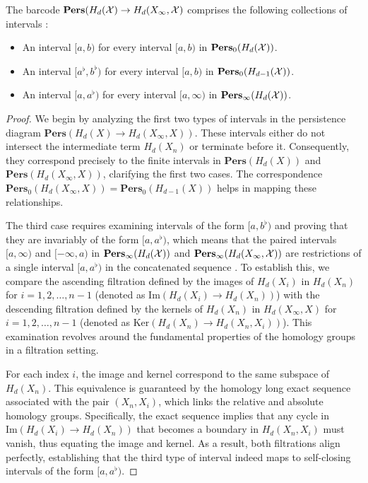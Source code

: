 \begin{corollary}
	The barcode $\textbf{Pers}(H_{d}({\mathcal{X}}) \rightarrow H_{d}(X_{\infty}, {\mathcal{X}})$ comprises
	the following collections of intervals \cite[\S 2.5]{de2011dualities}:
	\begin{itemize}
		\item An interval $[a,b)$ for every interval $[a,b)$ in $\textbf{Pers}_{0}(H_{d}
			({\mathcal{X}}))$.

		\item An interval $[a^{\flat}, b^{\flat})$ for every interval $[a,b)$ in $\textbf
			{Pers}_{0}(H_{d-1}({\mathcal{X}}))$.

		\item An interval $[a,a^{\flat})$ for every interval $[a,\infty)$ in $\textbf
			{Pers}_{\infty}(H_{d}({\mathcal{X}}))$.
	\end{itemize}
\end{corollary}

\begin{proof}
	We begin by analyzing the first two types of intervals in the persistence diagram
	$\textbf{Pers}(H_{d}(X) \to H_{d}(X_{\infty}, X))$. These intervals either do
	not intersect the intermediate term $H_{d}(X_{n})$ or terminate before it. Consequently,
	they correspond precisely to the finite intervals in $\textbf{Pers}(H_{d}(X))$
	and $\textbf{Pers}(H_{d}(X_{\infty}, X))$, clarifying the first two cases. The
	correspondence
	$\textbf{Pers}_{0}(H_{d}(X_{\infty}, X)) = \textbf{Pers}_{0}(H_{d-1}(X))$
	helps in mapping these relationships.

	The third case requires examining intervals of the form $[a, b^{\flat})$ and
	proving that they are invariably of the form $[a, a^{\flat})$, which means that
	the paired intervals $[a,\infty)$ and $[-\infty,a)$ in $\textbf{Pers}_{\infty}(
	H_{d}({\mathcal{X}}))$ and $\textbf{Pers}_{\infty}(H_{d}(X_{\infty}, {\mathcal{X}}))$ are restrictions
	of a single interval $[a,a^{\flat})$ in the concatenated sequence \cite[p.6]{de2011dualities}.
	To establish this, we compare the ascending filtration defined by the images of
	$H_{d}(X_{i})$ in $H_{d}(X_{n})$ for $i = 1, 2, \ldots, n-1$ (denoted as
	$\text{Im}(H_{d}(X_{i}) \to H_{d}(X_{n}))$) with the descending filtration defined
	by the kernels of $H_{d}(X_{n})$ in $H_{d}(X_{\infty}, X)$ for $i = 1, 2, \ldots
	, n-1$ (denoted as $\text{Ker}(H_{d}(X_{n}) \to H_{d}(X_{n}, X_{i}))$). This
	examination revolves around the fundamental properties of the homology groups
	in a filtration setting.

	For each index $i$, the image and kernel correspond to the same subspace of $H_{d}
	(X_{n})$. This equivalence is guaranteed by the homology long exact sequence
	associated with the pair $(X_{n}, X_{i})$, which links the relative and absolute
	homology groups. Specifically, the exact sequence implies that any cycle in $\text{Im}
	(H_{d}(X_{i}) \to H_{d}(X_{n}))$ that becomes a boundary in $H_{d}(X_{n}, X_{i}
	)$ must vanish, thus equating the image and kernel. As a result, both
	filtrations align perfectly, establishing that the third type of interval indeed
	maps to self-closing intervals of the form $[a, a^{\flat})$.
\end{proof}


